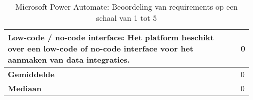 \begin{landscape}
\begin{table}[H]
{\begin{tabular}{|ll|}
\multicolumn{1}{|l|}{Low-code / no-code interface: Het platform beschikt over een low-code of no-code interface voor het aanmaken van data integraties.}                                                                   & 0                            \\ \hline
\multicolumn{1}{|l|}{\textbf{Gemiddelde}}                                                                                                                                                                                  & 0                            \\ \hline
\multicolumn{1}{|l|}{\textbf{Mediaan}}                                                                                                                                                                                     & 0                            \\ \hline
\end{tabular}
}
\caption{Microsoft Power Automate: Beoordeling van requirements op een schaal van 1 tot 5}
\end{table}

\end{landscape}

